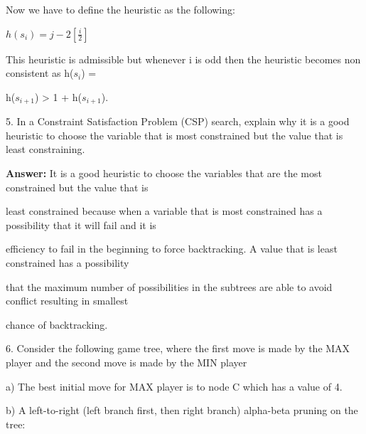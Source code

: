 \documentclass{article}
\begin{document}
Now we have to define the heuristic as the following:
\par
\centerline{$h(s_{i}) = j - 2[\frac{i}{2}]$}
\par
This heuristic is admissible but whenever i is odd then the heuristic becomes non consistent as h($s_{i}$) = 
\par
h($s_{i+1}$) > 1 + h($s_{i+1}$).
\newline
\setlength{\parindent}{0pt}
\par
5. In a Constraint Satisfaction Problem (CSP) search, explain why it is a good heuristic to choose the
variable that is most constrained but the value that is least constraining.
\par
\setlength{\parindent}{30pt}
\textbf{Answer:} It is a good heuristic to choose the variables that are the most constrained but the value that is  
\par
least constrained because when a variable that is most constrained has a possibility that it will fail and it is 
\par
efficiency to fail in the beginning to force backtracking. A value that is least constrained has a possibility 
\par
that the  maximum number of possibilities in the subtrees are able to avoid conflict resulting in smallest 
\par
chance of backtracking.
\newline
\setlength{\parindent}{0pt}
\par
6. Consider the following game tree, where the first move is made by the MAX player and the second
move is made by the MIN player
\par
\setlength{\parindent}{30pt}
a) The best initial move for MAX player is to node C which has a value of 4.
\newline
\par
b) A left-to-right (left branch first, then right branch) alpha-beta pruning on the tree: 
\newline
{}
\newline
\par
\end{document}
